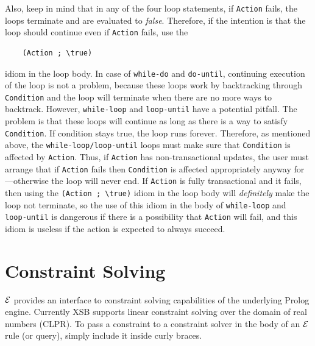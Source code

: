 \documentclass[11pt]{article}
\newcommand{\ERGO}{\mbox{\ensuremath{\cal{E}}\smaller{{\sc{RGO}}}}\xspace}
\newcommand{\FLSYSTEM}{\ERGO}
\newcommand{\bs}{\textbackslash}
\begin{document}
Also, keep in mind that in any of the four loop statements, if {\tt Action}
fails, the loops terminate and are evaluated to \emph{false}. Therefore,
if the intention is that the loop should continue even if {\tt Action}
fails, use the
\begin{verbatim}
    (Action ; \true)  
\end{verbatim}
idiom in the loop body. In case of {\tt while-do} and {\tt do-until},
continuing execution of the loop is not a problem, because these loops work
by backtracking through {\tt Condition} and the loop will terminate when
there are no more ways to backtrack. However, {\tt while-loop}
and {\tt loop-until}  have a potential pitfall. The problem is that
these loops will continue as long as there is a way to satisfy {\tt
  Condition}.  If condition stays true, the loop runs forever.
Therefore, as mentioned above, the \texttt{while-loop/loop-until}
loops must make sure that {\tt Condition}
is affected by {\tt Action}. Thus, if {\tt Action} has non-transactional updates,
the user must arrange that if {\tt Action} fails then {\tt Condition} is
affected appropriately anyway for---otherwise the loop will never end.
If {\tt Action} is fully transactional and it fails, then using the
{\tt (Action ; \bs{}true)} idiom in the loop body will \emph{definitely} make the loop
not terminate, so the use of this idiom in the body of {\tt while-loop} and {\tt
  loop-until} is dangerous if there is a possibility that {\tt Action} will
fail, and this idiom is useless if the action is expected to always succeed.



\section{Constraint Solving}\label{sec-clp}

\FLSYSTEM provides an interface to constraint solving capabilities of the
underlying Prolog engine. Currently XSB supports linear constraint solving
over the domain of real numbers (CLPR).
To pass a constraint to a constraint solver in the body of an \FLSYSTEM
rule (or query), simply include it inside curly braces.
\end{document}
